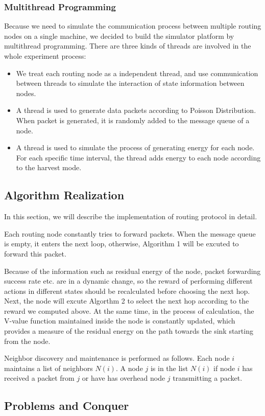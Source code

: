 \documentclass[10pt,twocolumn,letterpaper]{article}
\begin{document}
\subsubsection{Multithread Programming}
	Because we need to simulate the communication process between multiple routing nodes on a single machine, we decided to build the simulator platform by multithread programming. There are three kinds of threads are involved in the whole experiment process:
	\begin{itemize}
		\item We treat each routing node as a independent thread, and use communication between threads to simulate the interaction of state information between nodes.
		\item A thread is used to generate data packets according to Poisson Distribution. When packet is generated, it is randomly added to the message queue of a node.
		\item A thread is used to simulate the process of generating energy for each node. For each specific time interval, the thread adds energy to each node according to the harvest mode.
	\end{itemize}
\subsection{Algorithm Realization}
	In this section, we will describe the implementation of routing protocol in detail.
	
	Each routing node constantly tries to forward packets. When the message queue is empty, it enters the next loop, otherwise, Algorithm 1 will be excuted to forward this packet.
	
	Because of the information such as residual energy of the node, packet forwarding success rate etc. are in a dynamic change, so the reward of performing different actions in different states should be recalculated before choosing the next hop. Next, the node will excute Algorthm 2 to select the next hop according to the reward we computed above. At the same time, in the process of calculation, the V-value function maintained inside the node is constantly updated, which provides a measure of the residual energy on the path towards the sink starting from the node.
	
	Neighbor discovery and maintenance is performed as follows. Each node $i$ maintains a list of neighbors $N(i)$. A node $j$ is in the list $N(i)$ if node $i$ has received a packet from $j$ or have has overhead node $j$ transmitting a packet.
\subsection{Problems and Conquer}
\end{document}
